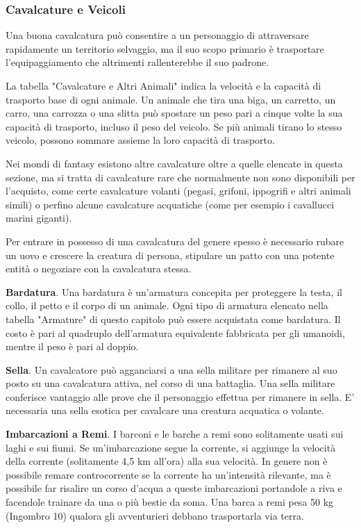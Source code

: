 \documentclass[12pt,a4paper,twoside,openany]{book}
\begin{document}
\begin{multicols}{2}


\subsubsection{Cavalcature e Veicoli}

Una buona cavalcatura può consentire a un personaggio di attraversare rapidamente un territorio selvaggio, ma il suo scopo primario è trasportare l'equipaggiamento che altrimenti rallenterebbe il suo padrone.

La tabella "Cavalcature e Altri Animali" indica la velocità e la capacità di trasporto base di ogni animale. Un animale che tira una biga, un carretto, un carro, una carrozza o una slitta può spostare un peso pari a cinque volte la sua capacità di trasporto, incluso il peso del veicolo. Se più animali tirano lo stesso veicolo, possono sommare assieme la loro capacità di trasporto.

Nei mondi di fantasy esistono altre cavalcature oltre a quelle elencate in questa sezione, ma si tratta di cavalcature rare che normalmente non sono disponibili per l'acquisto, come certe cavalcature volanti (pegasi, grifoni, ippogrifi e altri animali simili) o perfino alcune cavalcature acquatiche (come per esempio i cavallucci marini giganti).

Per entrare in possesso di una cavalcatura del genere spesso è necessario rubare un uovo e crescere la creatura di persona, stipulare un patto con una potente entità o negoziare con la cavalcatura stessa.

\textbf{Bardatura}. Una bardatura è un'armatura concepita per proteggere la testa, il collo, il petto e il corpo di un animale. Ogni tipo di armatura elencato nella tabella "Armature" di questo capitolo può essere acquistata come bardatura. Il costo è pari al quadruplo dell'armatura equivalente fabbricata per gli umanoidi, mentre il peso è pari al doppio.



\textbf{Sella}. Un cavalcatore può agganciarsi a una sella militare per rimanere al suo posto su una cavalcatura attiva, nel corso di una battaglia. Una sella militare conferisce vantaggio alle prove che il personaggio effettua per rimanere in sella. E' necessaria una sella esotica per cavalcare una creatura acquatica o volante.


\textbf{Imbarcazioni a Remi}. I barconi e le barche a remi sono solitamente usati sui laghi e sui fiumi. Se un'imbarcazione segue la corrente, si aggiunge la velocità della corrente (solitamente 4,5 km all'ora) alla sua velocità. In genere non è possibile remare controcorrente se la corrente ha un'intensità rilevante, ma è possibile far risalire un corso d'acqua a queste imbarcazioni portandole a riva e facendole trainare da una o più bestie da soma. Una barca a remi pesa 50 kg (Ingombro 10) qualora gli avventurieri debbano trasportarla via terra.


\end{multicols}
\end{document}
